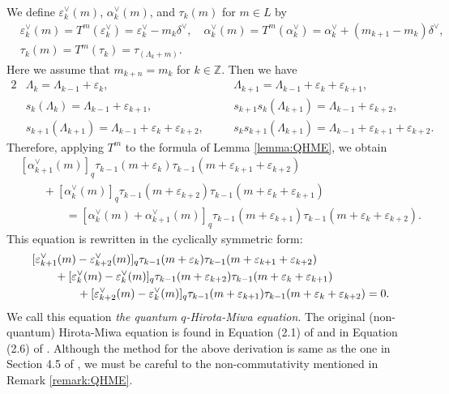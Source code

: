 \documentclass[12pt,twoside]{article}
\newcommand\av{\alpha^\vee}
\newcommand\eps{\varepsilon}
\newcommand\epsv{\eps^\vee}
\newcommand\deltav{\delta^\vee}
\newcommand\Z{{\mathbb Z}} %
\theoremstyle{plain} %
\theoremstyle{definition} %
\theoremstyle{definition} %
\numberwithin{theorem}{section}
\numberwithin{equation}{section}
\numberwithin{figure}{section}
\numberwithin{table}{section}
\newcommand\lemmaref[1]{Lemma \ref{#1}}
\newcommand\remarkref[1]{Remark \ref{#1}}
\begin{document}
We define $\epsv_k(m)$, $\av_k(m)$, and $\tau_k(m)$ for $m\in L$ by
\begin{align*}
 &
 \epsv_k(m) = T^m(\epsv_k) = \epsv_k - m_k\deltav, 
 \quad
 \av_k(m)=T^m(\av_k)=\av_k+(m_{k+1}-m_k)\deltav,
 \\ &
 \tau_k(m) = T^m(\tau_k) = \tau_{(\Lambda_k+m)}.
\end{align*}
Here we assume that $m_{k+n}=m_k$ for $k\in\Z$.
Then we have
\begin{alignat*}{2}
&
\Lambda_k = \Lambda_{k-1}+\eps_k, \quad
& &
\Lambda_{k+1} = \Lambda_{k-1}+\eps_k+\eps_{k+1}, 
\\ &
s_k(\Lambda_k) = \Lambda_{k-1}+\eps_{k+1}, \quad
& &
s_{k+1}s_k(\Lambda_{k+1}) = \Lambda_{k-1}+\eps_{k+2},
\\ &
s_{k+1}(\Lambda_{k+1}) = \Lambda_{k-1}+\eps_k+\eps_{k+2}, \quad
& &
s_k s_{k+1}(\Lambda_{k+1}) = \Lambda_{k-1}+\eps_{k+1}+\eps_{k+2}.
\end{alignat*}
Therefore, applying $T^m$ to the formula of \lemmaref{lemma:QHME},
we obtain
\begin{align*}
 &
   [\av_{k+1}(m)]_q \tau_{k-1}(m+\eps_k)     \tau_{k-1}(m+\eps_{k+1}+\eps_{k+2})
 \\ & \qquad
 + [\av_k(m)]_q     \tau_{k-1}(m+\eps_{k+2}) \tau_{k-1}(m+\eps_k+\eps_{k+1})
 \\ & \qquad\qquad
 = [\av_k(m)+\av_{k+1}(m)]_q \tau_{k-1}(m+\eps_{k+1}) \tau_{k-1}(m+\eps_k+\eps_{k+2}).
\end{align*}
This equation is rewritten in the cyclically symmetric form:
\begin{align}
 &
   [\epsv_{k+1}(m)-\epsv_{k+2}(m)]_q \tau_{k-1}(m+\eps_k)     \tau_{k-1}(m+\eps_{k+1}+\eps_{k+2})
 \notag
 \\ & \qquad
 + [\epsv_k(m)-\epsv_k(m)]_q          \tau_{k-1}(m+\eps_{k+2}) \tau_{k-1}(m+\eps_k+\eps_{k+1})
 \label{eq:QHME}
 \\ & \qquad\qquad
 + [\epsv_{k+2}(m)-\epsv_k(m)]_q     \tau_{k-1}(m+\eps_{k+1}) \tau_{k-1}(m+\eps_k+\eps_{k+2})
 =0.
 \notag
\end{align}
We call this equation {\em the quantum $q$-Hirota-Miwa equation}.
The original (non-quantum) Hirota-Miwa equation is found in  
Equation (2.1) of \cite{Hirota} and in Equation (2.6) of \cite{Miwa}.
Although the method for the above derivation is same as 
the one in Section 4.5 of \cite{Noumi},
we must be careful to the non-commutativity mentioned in \remarkref{remark:QHME}.
\end{document}
